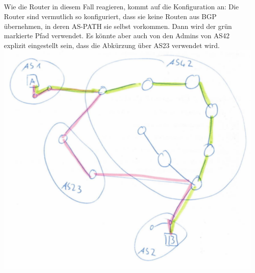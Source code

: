 \documentclass[a4paper,
			llpt,
			solution,
			accentcolor=tud2d,
			colorbacktitle
			]
			{tudexercise}
\newcommand{\8}{$\infty$}
\begin{document}
\subsection{}
\begin{multicols}{2}
Wie die Router in diesem Fall reagieren, kommt auf die Konfiguration an: Die Router sind vermutlich so konfiguriert, dass sie keine Routen aus BGP übernehmen, in deren AS-PATH sie selbst vorkommen. Dann wird der grün markierte Pfad verwendet. Es könnte aber auch von den Admins von AS42 explizit eingestellt sein, dass die Abkürzung über AS23 verwendet wird. \vfill \columnbreak
\includegraphics[scale=0.5]{4_3_2.pdf}
\end{multicols}
\end{document}
